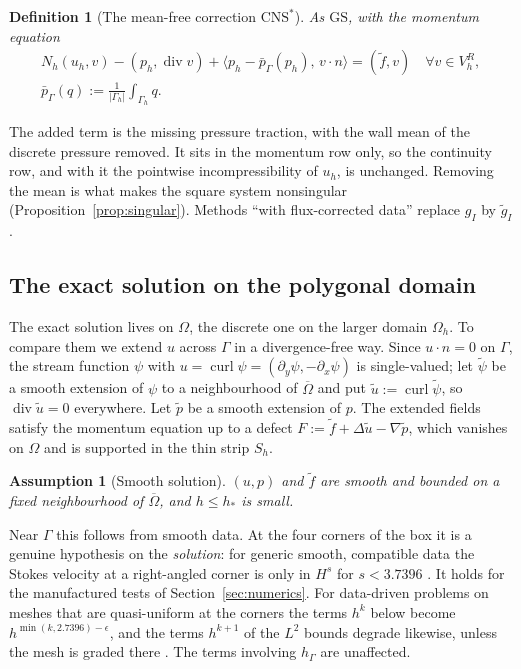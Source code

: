 \documentclass[pdflatex,sn-mathphys-num]{sn-jnl}
\theoremstyle{thmstyleone}
\theoremstyle{thmstylethree}
\newtheorem{definition}[theorem]{Definition}
\newtheorem{assumption}[theorem]{Assumption}
\newcommand{\hG}{h_\Gamma}
\newcommand{\Gh}{\Gamma_h}
\newcommand{\Oh}{\Omega_h}
\newcommand{\VR}{V_h^R}
\newcommand{\gI}{g_I}
\newcommand{\ut}{\tilde u}
\newcommand{\pt}{\tilde p}
\newcommand{\ft}{\tilde f}
\newcommand{\psit}{\tilde\psi}
\newcommand{\pbG}{\bar p_{\Gamma}}
\newcommand{\ip}[2]{\langle #1,\, #2\rangle}
\newcommand{\GS}{\mathrm{GS}}
\newcommand{\CNS}{\mathrm{CNS}^\ast}
\newcommand{\curl}{\operatorname{curl}}
\renewcommand{\div}{\operatorname{div}}
\begin{document}
\begin{definition}[The mean-free correction $\CNS$]\label{def:cns}
As $\GS$, with the momentum equation
\begin{gather*}
N_h(u_h,v)-(p_h,\div v)+\ip{p_h-\pbG(p_h)}{v\cdot n}=(\ft,v)\quad\forall v\in\VR,\\
\pbG(q):=\frac1{|\Gh|}\int_{\Gh}q .
\end{gather*}
\end{definition}
The added term is the missing pressure traction, with the wall mean of the discrete pressure removed. It sits in the momentum row only, so the continuity row, and with it the pointwise incompressibility of $u_h$, is unchanged. Removing the mean is what makes the square system nonsingular (Proposition~\ref{prop:singular}). Methods ``with flux-corrected data'' replace $\gI$ by $\tilde g_I$.

\subsection{The exact solution on the polygonal domain}
The exact solution lives on $\Omega$, the discrete one on the larger domain $\Oh$. To compare them we extend $u$ across $\Gamma$ in a divergence-free way. Since $u\cdot n=0$ on $\Gamma$, the stream function $\psi$ with $u=\curl\psi=(\partial_y\psi,-\partial_x\psi)$ is single-valued; let $\psit$ be a smooth extension of $\psi$ to a neighbourhood of $\overline\Omega$ and put $\ut:=\curl\psit$, so $\div\ut=0$ everywhere. Let $\pt$ be a smooth extension of $p$. The extended fields satisfy the momentum equation up to a defect $F:=\ft+\Delta\ut-\nabla\pt$, which vanishes on $\Omega$ and is supported in the thin strip $S_h$.

\begin{assumption}[Smooth solution]\label{ass:D}
$(u,p)$ and $\ft$ are smooth and bounded on a fixed neighbourhood of $\overline\Omega$, and $h\le h_\ast$ is small.
\end{assumption}
Near $\Gamma$ this follows from smooth data. At the four corners of the box it is a genuine hypothesis on the \emph{solution}: for generic smooth, compatible data the Stokes velocity at a right-angled corner is only in $H^s$ for $s<3.7396$ \cite{Dauge1989}. It holds for the manufactured tests of Section~\ref{sec:numerics}. For data-driven problems on meshes that are quasi-uniform at the corners the terms $h^k$ below become $h^{\min(k,2.7396)-\epsilon}$, and the terms $h^{k+1}$ of the $L^2$ bounds degrade likewise, unless the mesh is graded there \cite{PadhiExt}. The terms involving $\hG$ are unaffected.
\end{document}

